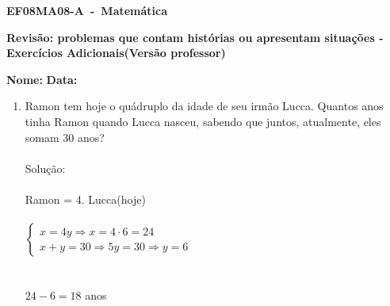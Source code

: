 \documentclass[a4paper,14pt]{article}
\begin{document}
	
	\noindent\textbf{EF08MA08-A~-~Matemática} 
	
	\begin{center}
		\textbf{Revisão: problemas que contam histórias ou apresentam situações - Exercícios Adicionais(Versão professor)}
	\end{center}
	
	
	\noindent\textbf{Nome:} \underline{\hspace{10cm}}
    \noindent\textbf{Data:} \underline{\hspace{4cm}}
	
	
	\begin{multicols}{2}
	\begin{enumerate}
		\item Ramon tem hoje o quádruplo da idade de seu irmão Lucca. Quantos anos tinha Ramon quando Lucca nasceu, sabendo que juntos, atualmente, eles somam 30 anos?\\\\
		Solução: \\\\
		Ramon = 4. Lucca(hoje) \\ \\
		$\begin{cases}
			x = 4y \Rightarrow x = 4 \cdot 6 = 24 \\
			x + y = 30 \Rightarrow 5y = 30 \Rightarrow y = 6
		\end{cases}$ \\\\\\
	    $24 - 6 = 18$ anos
		

\end{enumerate}
\end{multicols}
\end{document}
